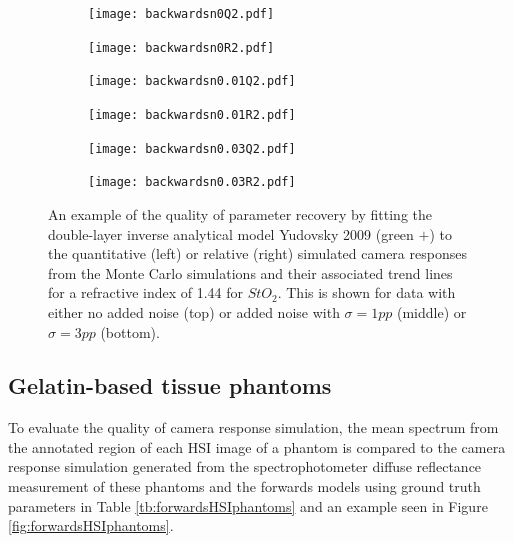 \begin{figure}[h!]
    \centering
    \begin{subfigure}{0.49\textwidth}
        \texttt{[image: backwardsn0Q2.pdf]}
        \caption{}
        \label{fig:backwardsn0Q2}
    \end{subfigure}
    \begin{subfigure}{0.49\textwidth}
        \texttt{[image: backwardsn0R2.pdf]}
        \caption{}
        \label{fig:backwardsn0R2}
    \end{subfigure}
    \begin{subfigure}{0.49\textwidth}
        \texttt{[image: backwardsn0.01Q2.pdf]}
        \caption{}
        \label{fig:backwardsn0.01Q2}
    \end{subfigure}
    \begin{subfigure}{0.49\textwidth}
        \texttt{[image: backwardsn0.01R2.pdf]}
        \caption{}
        \label{fig:backwardsm0.01R2}
    \end{subfigure}
    \begin{subfigure}{0.49\textwidth}
        \texttt{[image: backwardsn0.03Q2.pdf]}
        \caption{}
        \label{fig:backwardsn0.03Q2}
    \end{subfigure}
    \begin{subfigure}{0.49\textwidth}
        \texttt{[image: backwardsn0.03R2.pdf]}
        \caption{}
        \label{fig:backwardsm0.03R2}
    \end{subfigure}
    \caption{An example of the quality of parameter recovery by fitting the double-layer inverse analytical model Yudovsky 2009 (\textcolor{MyGreen}{green $+$}) to the quantitative (left) or relative (right) simulated camera responses from the Monte Carlo simulations and their associated trend lines for a refractive index of 1.44 for $StO_2$. This is shown for data with either no added noise (top) or added noise with $\sigma = 1pp$ (middle) or $\sigma = 3pp$ (bottom).}
    \label{fig:backwardsHSIMC2}
\end{figure}
\FloatBarrier

\subsection{Gelatin-based tissue phantoms}
To evaluate the quality of camera response simulation, the mean spectrum from the annotated region of each HSI image of a phantom is compared to the camera response simulation generated from the spectrophotometer diffuse reflectance measurement of these phantoms and the forwards models using ground truth parameters in Table \ref{tb:forwardsHSIphantoms} and an example seen in Figure \ref{fig:forwardsHSIphantoms}. 

